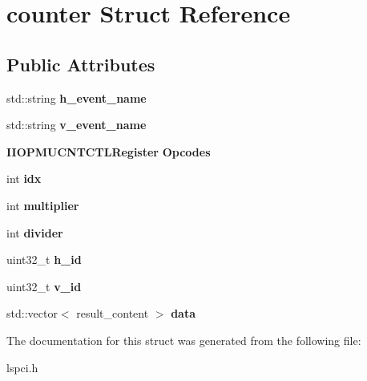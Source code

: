 \section{counter Struct Reference}
\label{structcounter}
\subsection*{Public Attributes}
\begin{DoxyCompactItemize}
\item 
\mbox{\label{structcounter_a1aa82284d173d259573d433c67cb6056}} 
std\+::string {\bfseries h\+\_\+event\+\_\+name}
\item 
\mbox{\label{structcounter_a4dea3073fd9a7aa1240227d797acf55a}} 
std\+::string {\bfseries v\+\_\+event\+\_\+name}
\item 
\mbox{\label{structcounter_a63457f99b045b0811071b9584557238f}} 
\textbf{ I\+I\+O\+P\+M\+U\+C\+N\+T\+C\+T\+L\+Register} {\bfseries Opcodes}
\item 
\mbox{\label{structcounter_aa6611db7a280c8bb6bf4e19506bc6a02}} 
int {\bfseries idx}
\item 
\mbox{\label{structcounter_ac3b51026bf7769fe85471d2f7f914c49}} 
int {\bfseries multiplier}
\item 
\mbox{\label{structcounter_a97ec3319c8309f41de78490a46cb5e55}} 
int {\bfseries divider}
\item 
\mbox{\label{structcounter_ac4cc48aebe0bd4cdc697b9023f41ab0e}} 
uint32\+\_\+t {\bfseries h\+\_\+id}
\item 
\mbox{\label{structcounter_a5c5c189e06e1164376c56b639b061f11}} 
uint32\+\_\+t {\bfseries v\+\_\+id}
\item 
\mbox{\label{structcounter_adf1eaa882497ab6bbdcc006071e26101}} 
std\+::vector$<$ result\+\_\+content $>$ {\bfseries data}
\end{DoxyCompactItemize}


The documentation for this struct was generated from the following file\+:\begin{DoxyCompactItemize}
\item 
lspci.\+h\end{DoxyCompactItemize}

